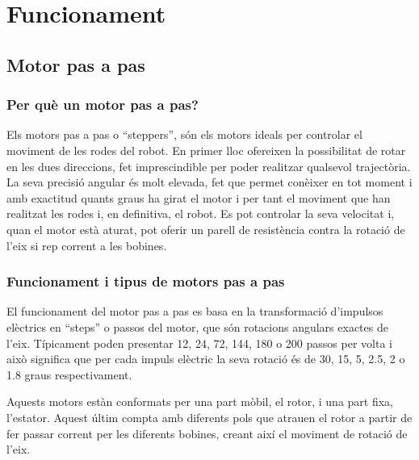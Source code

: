\setlength\topmargin{8mm}
\onehalfspacing
\chapter{Funcionament} %

\label{Chapter2} %





\section{Motor pas a pas}
\subsection{Per què un motor pas a pas?}

Els motors pas a pas o “steppers”, són els motors ideals per controlar el moviment de les rodes del robot. En primer lloc ofereixen la possibilitat de rotar en les dues direccions, fet imprescindible per poder realitzar qualsevol trajectòria. La seva precisió angular és molt elevada, fet que permet conèixer en tot moment i amb exactitud quants graus ha girat el motor i per tant el moviment que han realitzat les rodes i, en definitiva, el robot. Es pot controlar la seva velocitat i, quan el motor està aturat, pot oferir un parell de resistència contra la rotació de l'eix si rep corrent a les bobines. 


\subsection{Funcionament i tipus de motors pas a pas}
El funcionament del motor pas a pas es basa en la transformació d'impulsos elèctrics en “steps” o passos del motor, que són rotacions angulars exactes de l'eix. Típicament poden presentar 12, 24, 72, 144, 180 o 200 passos per volta i això significa que per cada impuls elèctric la seva rotació és de 30, 15, 5, 2.5, 2 o 1.8 graus respectivament. 

Aquests motors estàn conformats per una part mòbil, el rotor, i una part fixa, l'estator. Aquest últim compta amb diferents pols que atrauen el rotor a partir de fer passar corrent per les diferents bobines, creant així el moviment de rotació de l'eix.

